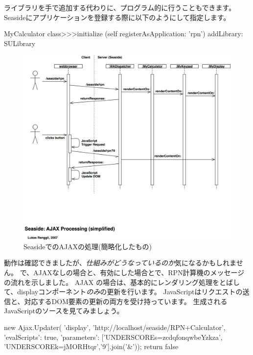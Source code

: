 \documentclass[a4paper,10pt,twoside]{book}
\begin{document}
ライブラリを手で追加する代わりに、プログラム的に行うこともできます。Seasideにアプリケーションを登録する際に以下のようにして指定します。
\begin{code}{}
MyCalculator class>>>initialize
	(self registerAsApplication: 'rpn')
		addLibrary: SULibrary
\end{code}

\begin{figure}[ht]
\begin{center}
\includegraphics[width=\textwidth]{ajax-processing}
\caption{SeasideでのAJAXの処理(簡略化したもの)}
\end{center}
\end{figure}


動作は確認できましたが、\emph{仕組みがどうなっているのか}気になるかもしれません。
で、AJAXなしの場合と、有効にした場合とで、RPN計算機のメッセージの流れを示しました。
AJAX の場合は、基本的にレンダリング処理をとばして、displayコンポーネント\emph{のみ}の更新を行います。
JavaScriptはリクエストの送信と、対応するDOM要素の更新の両方を受け持っています。
生成されるJavaScriptのソースを見てみましょう。

\begin{code}{}
new Ajax.Updater(
	'display',
	'http://localhost/seaside/RPN+Calculator',
	{'evalScripts': true,
	  'parameters': ['UNDERSCOREs=zcdqfonqwbeYzkza', 'UNDERSCOREk=jMORHtqr','9'].join('&')});
return false
\end{code}
\end{document}
